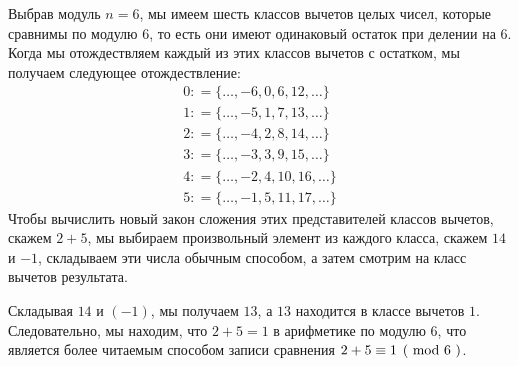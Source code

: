 \begin{example} 
\label{def_residue_ring_z_6}
Выбрав модуль $ n = 6 $, мы имеем шесть классов вычетов целых чисел, которые сравнимы по модулю $ 6 $, то есть они имеют одинаковый остаток при делении на $6$. Когда мы отождествляем каждый из этих классов вычетов с остатком, мы получаем следующее отождествление:
$$
\begin{array}{l}
0: = \{\ldots, -6,0,6,12, \ldots \}\\
1: = \{\ldots, -5,1,7,13, \ldots \}\\
2: = \{\ldots, -4,2,8,14, \ldots \} \\
3: = \{\ldots, -3,3,9,15, \ldots \}\\
4: = \{\ldots, -2,4,10,16, \ldots \}\\
5: = \{\ldots, -1,5,11,17, \ldots \}
\end{array}
$$
Чтобы вычислить новый закон сложения этих представителей классов вычетов, скажем $2+5$, мы выбираем произвольный элемент из каждого класса, скажем $14$ и $-1$, складываем эти числа обычным способом, а затем смотрим на класс вычетов результата.

Складывая $14$ и $(-1)$, мы получаем $13$, а $13$ находится в классе вычетов $1$. Следовательно, мы находим, что $2+5=1$ в арифметике по модулю $6$, что является более читаемым способом записи сравнения $\kongru{2+5}{1}{6}$.


\end{example}
